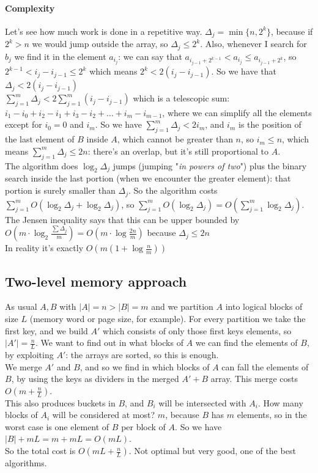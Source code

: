 \documentclass[10pt]{report}
\begin{document}
\paragraph{Complexity} Let's see how much work is done in a repetitive way. $\Delta_j = \min\{n, 2^k\}$, because if $2^k > n$ we would jump outside the array, so $\Delta_j \leq 2^k$. Also, whenever I search for $b_j$ we find it in the element $a_{i_j}$: we can say that $a_{i_{j-1} + 2^{k-1}} < a_{i_j} \leq a_{i_{j-1} + 2^k}$, so $2^{k-1} < i_j - i_{j-1} \leq 2^k$ which means $2^k < 2(i_j - i_{j-1})$. So we have that $\Delta_j < 2(i_j - i_{j-1})$\\
$\sum_{j=1}^m \Delta_j < 2\sum_{j=1}^m (i_j - i_{j-1})$ which is a telescopic sum: $i_1 - i_0 + i_2 - i_1 + i_3 - i_2 + \ldots + i_m - i_{m-1}$, where we can simplify all the elements except for $i_0 = 0$ and $i_m$. So we have $\sum_{j=1}^m \Delta_j < 2 i_m$, and $i_m$ is the position of the last element of $B$ inside $A$, which cannot be greater than $n$, so $i_m \leq n$, which means $\sum_{j=1}^m \Delta_j \leq 2n$: there's an overlap, but it's still proportional to $A$.\\
The algorithm does $\log_2 \Delta_j$ jumps (jumping "\textit{in powers of two}") plus the binary search inside the last portion (when we encounter the greater element): that portion is surely smaller than $\Delta_j$. So the algorithm costs $\sum_{j=1}^m O(\log_2\Delta_j + \log_2 \Delta_j)$, so $\sum_{j=1}^m O(\log_2\Delta_j) = O\left(\sum_{j=1}^m\log_2\Delta_j\right)$. The Jensen inequality says that this can be upper bounded by $O\left(m\cdot\log_2\frac{\sum\Delta_j}{m}\right) = O(m\cdot\log\frac{2n}{m})$ because $\Delta_j \leq 2n$\\
In reality it's exactly $O(m(1+\log\frac{n}{m}))$
\subsection{Two-level memory approach} As usual $A, B$ with $|A| = n > |B| = m$ and we partition $A$ into logical blocks of size $L$ (memory word or page size, for example). For every partition we take the first key, and we build $A'$ which consists of only those first keys elements, so $|A'| = \frac{n}{L}$. We want to find out in what blocks of $A$ we can find the elements of $B$, by exploiting $A'$: the arrays are sorted, so this is enough.\\
We merge $A'$ and $B$, and so we find in which blocks of $A$ can fall the elements of $B$, by using the keys as dividers in the merged $A'+B$ array. This merge costs $O\left(m + \frac{n}{L}\right)$.\\
This also produces buckets in $B$, and $B_i$ will be intersected with $A_i$. How many blocks of $A_i$ will be considered at most? $m$, because $B$ has $m$ elements, so in the worst case is one element of $B$ per block of $A$. So we have $|B| + mL = m + mL = O(mL)$.\\
So the total cost is $O(mL + \frac{n}{L})$. Not optimal but very good, one of the best algorithms.
\end{document}
